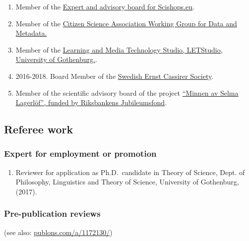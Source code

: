 \documentclass[
]{article}
\providecommand{\tightlist}{%
  \setlength{\itemsep}{0pt}\setlength{\parskip}{0pt}}
\begin{document}
\begin{enumerate}
\def\labelenumi{\arabic{enumi}.}
\tightlist
\item
  Member of the
  \href{https://www.scishops.eu/export-and-advisory-board/\#16}{Expert
  and advisory board for Scishops.eu}.
\item
  Member of the
  \href{https://citizenscienceassociation.org/overview/steering-committees/\#metadata}{Citizen
  Science Association Working Group for Data and Metadata.}
\item
  Member of the
  \href{http://letstudio.gu.se/members/christopher-kullenberg}{Learning
  and Media Technology Studio, LETStudio, University of Gothenburg.}.
\item
  2016-2018. Board Member of the
  \href{http://cassirer.se/sallskapet/styrelse/}{Swedish Ernst Cassirer
  Society}.
\item
  Member of the scientific advisory board of the project
  \href{http://anslag.rj.se/sv/anslag/52553}{``Minnen av Selma
  Lagerlöf'', funded by Riksbankens Jubileumsfond}.
\end{enumerate}

\hypertarget{referee-work}{%
\subsection{Referee work}\label{referee-work}}

\hypertarget{expert-for-employment-or-promotion}{%
\subsubsection{Expert for employment or
promotion}\label{expert-for-employment-or-promotion}}

\begin{enumerate}
\def\labelenumi{\arabic{enumi}.}
\tightlist
\item
  Reviewer for application as Ph.D.~candidate in Theory of Science,
  Dept. of Philosophy, Linguistics and Theory of Science, University of
  Gothenburg, (2017).
\end{enumerate}

\hypertarget{pre-publication-reviews}{%
\subsubsection{Pre-publication reviews}\label{pre-publication-reviews}}

(see also: \url{publons.com/a/1172130/})
\end{document}
